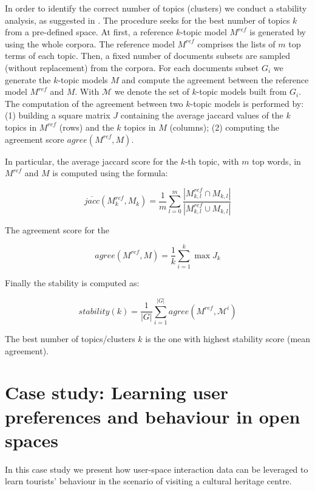 In order to identify the correct number of topics (clusters) we conduct  a stability analysis, as suggested in \cite{topicmodeeling:greene2014}.
The procedure seeks for the best number of topics $k$ from a pre-defined space. At first, a reference $k$-topic model $M^{ref}$ is generated by using the whole corpora.  The reference model $M^{ref}$ comprises the lists of $m$ top terms of each topic. Then, a fixed number of documents subsets are sampled (without replacement) from the corpora. %
For each documents subset $G_i$ we generate the $k$-topic models $M$ and compute the agreement between the reference model $M^{ref}$ and $M$. With $\mathcal{M}$ we denote the set of $k$-topic models built from $G_i$. The computation of the agreement between two $k$-topic models is performed by: (1) building a square matrix $J$ containing the average jaccard values of the $k$ topics in $M^{ref}$ (rows) and the $k$ topics in $M$ (columns); (2) computing the agreement score $agree(M^{ref},M)$.

In particular, the average jaccard score for the $k$-th topic, with $m$ top words, in $M^{ref}$ and $M$ is computed using the formula:

$$\overline{jacc}(M^{ref}_{k}, M_{k}) = \frac{1}{m} \sum_{l=0}^{m} \frac{|M^{ref}_{k,l} \cap M_{k,l}|}{|M^{ref}_{k,l} \cup M_{k,l}|}$$

The agreement score for the 

$$agree(M^{ref},M)=\frac{1}{k} \sum_{i=1}^{k} \max{J_k}$$

Finally the stability is computed as:

$$stability(k) = \frac{1}{|G|} \sum_{i=1}^{|G|}agree(M^{ref},\mathcal{M}^i)$$

The best number of topics/clusters $k$ is the one with highest stability score (mean agreement).


\section{Case study: Learning user preferences and behaviour in open spaces}
In this case study we present how user-space interaction data can be leveraged to learn tourists' behaviour in the scenario of visiting a cultural heritage centre. %

